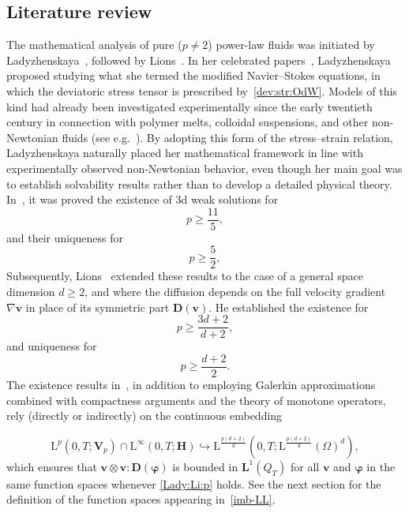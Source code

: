 \documentclass[12pt,reqno]{amsart}
\numberwithin{equation}{section}
\theoremstyle{definition}
\def\L{\mathrm{L}}
\def\vv{\boldsymbol{v}}
\def\bfL{\mathbf{L}}
\def\bfD{\mathbf{D}}
\def\bfi{\boldsymbol{\varphi}}
\begin{document}
\subsection{Literature review}
The mathematical analysis of pure ($p\not=2$) power-law fluids was initiated by {Ladyzhenskaya}~\cite{Lady-Steklov-1967,Lady-LOMI-1968}, followed by {Lions}~\cite{Lions:1969}.
In her celebrated papers~\cite{Lady-Steklov-1967,Lady-LOMI-1968}, {Ladyzhenskaya} proposed studying what she termed the modified Navier--Stokes equations, in which the deviatoric stress tensor is prescribed by~\eqref{dev:str:OdW}. Models of this kind had already been investigated experimentally since the early twentieth century in connection with polymer melts, colloidal suspensions, and other non-Newtonian fluids (see e.g.~\cite{Barnes:2000}). By adopting this form of the stress--strain relation, {Ladyzhenskaya} naturally placed her mathematical framework in line with experimentally observed non-Newtonian behavior, even though her main goal was to establish solvability results rather than to develop a detailed physical theory.
In~\cite{Lady-Steklov-1967,Lady-LOMI-1968}, it was proved
the existence of 3d weak solutions for
\begin{equation*}
p\geq \frac{11}{5},
\end{equation*}
and their uniqueness for
\begin{equation*}
p\geq \frac{5}{2},
\end{equation*}
Subsequently, {Lions}~\cite{Lions:1969} extended these results to the case of a general space dimension $d\geq 2$, and where the diffusion depends on the full velocity gradient $\nabla\vv$ in place of its symmetric part $\bfD(\vv)$. He established the existence for
\begin{equation}\label{Lady:Li:p}
p\geq\frac{3d+2}{d+2},
\end{equation}
and uniqueness for
\begin{equation*}
p\geq \frac{d+2}{2}.
\end{equation*}
The existence results in~\cite{Lady-Steklov-1967,Lady-LOMI-1968,Lions:1969}, in addition to employing Galerkin approximations combined with compactness arguments and the theory of monotone operators, rely (directly or indirectly) on the continuous embedding

\begin{equation}\label{imb-LL}
\L^p(0,T;\mathbf{V}_p)\cap\L^{\infty}(0,T;\mathbf{H})\hookrightarrow\L^{\frac{p(d+2)}{d}}(0,T;\L^{\frac{p(d+2)}{d}}(\Omega)^d),
\end{equation}
which ensures that $\vv\otimes\vv:\bfD(\bfi)$ is bounded in $\bfL^{1}(Q_T)$
for all $\vv$ and $\bfi$ in the same function spaces whenever \eqref{Lady:Li:p} holds.
See the next section for the definition of the function spaces appearing in~\eqref{imb-LL}.
\end{document}

